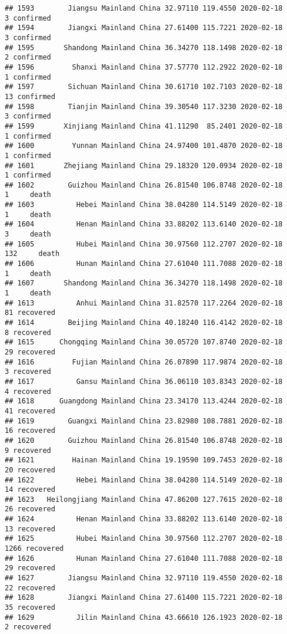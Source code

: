 \documentclass[
]{article}
\begin{document}
\begin{verbatim}
## 1593        Jiangsu Mainland China 32.97110 119.4550 2020-02-18     3 confirmed
## 1594        Jiangxi Mainland China 27.61400 115.7221 2020-02-18     3 confirmed
## 1595       Shandong Mainland China 36.34270 118.1498 2020-02-18     2 confirmed
## 1596         Shanxi Mainland China 37.57770 112.2922 2020-02-18     1 confirmed
## 1597        Sichuan Mainland China 30.61710 102.7103 2020-02-18    13 confirmed
## 1598        Tianjin Mainland China 39.30540 117.3230 2020-02-18     3 confirmed
## 1599       Xinjiang Mainland China 41.11290  85.2401 2020-02-18     1 confirmed
## 1600         Yunnan Mainland China 24.97400 101.4870 2020-02-18     1 confirmed
## 1601       Zhejiang Mainland China 29.18320 120.0934 2020-02-18     1 confirmed
## 1602        Guizhou Mainland China 26.81540 106.8748 2020-02-18     1     death
## 1603          Hebei Mainland China 38.04280 114.5149 2020-02-18     1     death
## 1604          Henan Mainland China 33.88202 113.6140 2020-02-18     3     death
## 1605          Hubei Mainland China 30.97560 112.2707 2020-02-18   132     death
## 1606          Hunan Mainland China 27.61040 111.7088 2020-02-18     1     death
## 1607       Shandong Mainland China 36.34270 118.1498 2020-02-18     1     death
## 1613          Anhui Mainland China 31.82570 117.2264 2020-02-18    81 recovered
## 1614        Beijing Mainland China 40.18240 116.4142 2020-02-18     8 recovered
## 1615      Chongqing Mainland China 30.05720 107.8740 2020-02-18    29 recovered
## 1616         Fujian Mainland China 26.07890 117.9874 2020-02-18     3 recovered
## 1617          Gansu Mainland China 36.06110 103.8343 2020-02-18     4 recovered
## 1618      Guangdong Mainland China 23.34170 113.4244 2020-02-18    41 recovered
## 1619        Guangxi Mainland China 23.82980 108.7881 2020-02-18    16 recovered
## 1620        Guizhou Mainland China 26.81540 106.8748 2020-02-18     9 recovered
## 1621         Hainan Mainland China 19.19590 109.7453 2020-02-18    20 recovered
## 1622          Hebei Mainland China 38.04280 114.5149 2020-02-18    14 recovered
## 1623   Heilongjiang Mainland China 47.86200 127.7615 2020-02-18    26 recovered
## 1624          Henan Mainland China 33.88202 113.6140 2020-02-18    13 recovered
## 1625          Hubei Mainland China 30.97560 112.2707 2020-02-18  1266 recovered
## 1626          Hunan Mainland China 27.61040 111.7088 2020-02-18    29 recovered
## 1627        Jiangsu Mainland China 32.97110 119.4550 2020-02-18    22 recovered
## 1628        Jiangxi Mainland China 27.61400 115.7221 2020-02-18    35 recovered
## 1629          Jilin Mainland China 43.66610 126.1923 2020-02-18     2 recovered

\end{verbatim}
\end{document}

